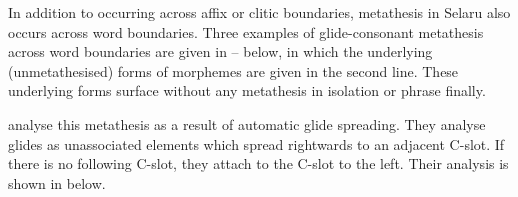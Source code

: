 In addition to occurring across affix or clitic boundaries, 
metathesis in Selaru also occurs across word boundaries.
Three examples of glide-consonant metathesis across word boundaries
are given in -- below,
in which the underlying (unmetathesised) forms
of morphemes are given in the second line.
These underlying forms surface without any
metathesis in isolation or phrase finally.

\begin{exe}
\let\eachwordone=\itshape
	\label{ex:ThaIsjou}
\end{exe}
\newpage
\begin{exe}
\let\eachwordone=\itshape
	\label{ex:OurFatIs}
\end{exe}

\cite{coco00} analyse this metathesis as a result of automatic glide spreading.
They analyse glides as unassociated elements which spread rightwards to an adjacent C-slot.
If there is no following C-slot, they attach to the C-slot to the left.
Their analysis is shown in  below.

